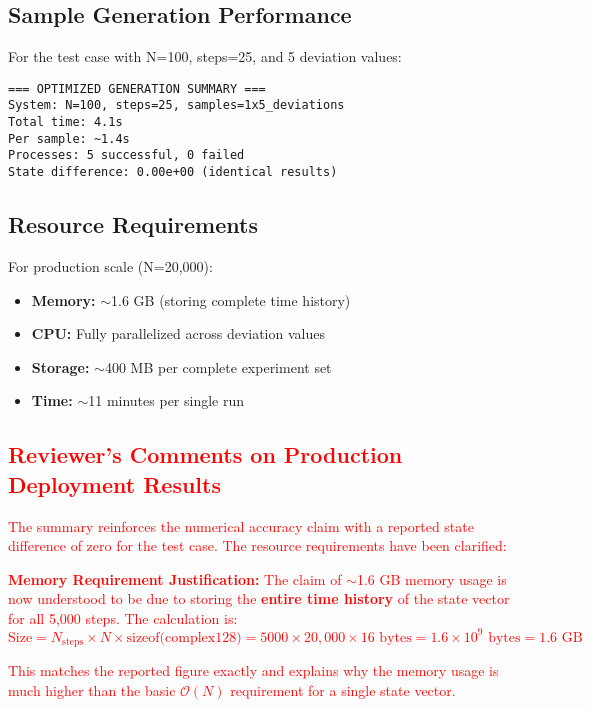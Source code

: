 \documentclass[11pt,a4paper]{article}
\newcommand{\bigO}{\mathcal{O}}
\begin{document}
\subsection{Sample Generation Performance}

For the test case with N=100, steps=25, and 5 deviation values:

\begin{lstlisting}[caption={Production deployment results}]
=== OPTIMIZED GENERATION SUMMARY ===
System: N=100, steps=25, samples=1x5_deviations
Total time: 4.1s
Per sample: ~1.4s
Processes: 5 successful, 0 failed
State difference: 0.00e+00 (identical results)
\end{lstlisting}

\subsection{Resource Requirements}

For production scale (N=20,000):
\begin{itemize}
\item \textbf{Memory:} $\sim$1.6 GB (storing complete time history)
\item \textbf{CPU:} Fully parallelized across deviation values
\item \textbf{Storage:} $\sim$400 MB per complete experiment set
\item \textbf{Time:} $\sim$11 minutes per single run
\end{itemize}

\textcolor{red}{
\subsection*{Reviewer's Comments on Production Deployment Results}
The summary reinforces the numerical accuracy claim with a reported state difference of zero for the test case. The resource requirements have been clarified:

\textbf{Memory Requirement Justification:} The claim of $\sim$1.6 GB memory usage is now understood to be due to storing the \textbf{entire time history} of the state vector for all 5,000 steps. The calculation is:
$$ \text{Size} = N_{\text{steps}} \times N \times \text{sizeof(complex128)} = 5000 \times 20{,}000 \times 16 \text{ bytes} = 1.6 \times 10^9 \text{ bytes} = 1.6 \text{ GB} $$

This matches the reported figure exactly and explains why the memory usage is much higher than the basic $\bigO(N)$ requirement for a single state vector.
}
\end{document}
